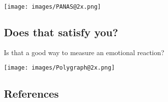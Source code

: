 \documentclass[
  letterpaper,
  DIV=11,
  numbers=noendperiod]{scrartcl}
\begin{document}
\texttt{[image: images/PANAS@2x.png]}

\hypertarget{does-that-satisfy-you}{%
\subsection{Does that satisfy you?}\label{does-that-satisfy-you}}

Is that a good way to measure an emotional reaction?

\texttt{[image: images/Polygraph@2x.png]}

\hypertarget{references}{%
\subsection*{References}\label{references}}
\end{document}
